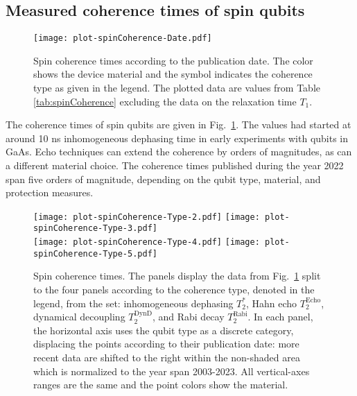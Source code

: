 \documentclass[aps, prx, showpacs, twocolumn, superscriptaddress, notitlepage, longbibliography, floatfix, nofootinbib]{revtex4-2}
\newcommand{\TRabi}{T_2^\mathrm{Rabi}}
\newcommand{\TEcho}{T_2^\mathrm{Echo}}
\newcommand{\TDynD}{T_2^\mathrm{DynD}}
\newcommand{\recheck}[1]{{#1}}
\begin{document}
\subsection{Measured coherence times of spin qubits}

\begin{figure}
  \texttt{[image: plot-spinCoherence-Date.pdf]}
  \caption{
  \label{fig:spinPhaseCoherenceAll}
  Spin coherence times according to the publication date. The color shows the device material and the symbol indicates the coherence type as given in the legend. The plotted data are values from Table \ref{tab:spinCoherence} excluding the data on the relaxation time $T_1$. 
  }
\end{figure}

The coherence times of spin qubits are given in Fig.~\ref{fig:spinPhaseCoherenceAll}. The values had started at around 10 ns inhomogeneous dephasing time in early experiments with qubits in GaAs. Echo techniques can extend the coherence by orders of magnitudes, as can a different material choice. \recheck{The coherence times published during the year 2022 span five orders of magnitude, depending on the qubit type, material, and protection measures.}

\begin{figure}
  \texttt{[image: plot-spinCoherence-Type-2.pdf]}
  \texttt{[image: plot-spinCoherence-Type-3.pdf]}\hfill \\
  \texttt{[image: plot-spinCoherence-Type-4.pdf]} \hfill
  \texttt{[image: plot-spinCoherence-Type-5.pdf]}
  \caption{
  \label{fig:spinPhaseCoherenceSubplots}
  Spin coherence times. The panels display the data from Fig.~\ref{fig:spinPhaseCoherenceAll} split to the four panels according to the coherence type, denoted in the legend, from the set: inhomogeneous dephasing $T_2^*$, Hahn echo $\TEcho$, dynamical decoupling $\TDynD$, and Rabi decay $\TRabi$. In each panel, the horizontal axis uses the qubit type as a discrete category, displacing the points according to their publication date: more recent data are shifted to the right within the non-shaded area which is \recheck{normalized to the year span 2003-2023}. All vertical-axes ranges are the same and the point colors show the material.
  }
\end{figure}
\end{document}
